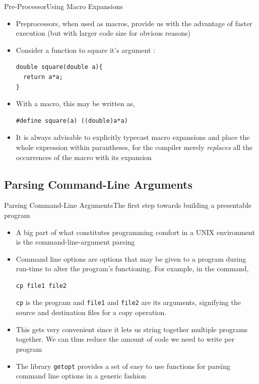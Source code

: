 \documentclass{beamer}
\begin{document}
\begin{frame}[fragile]{Pre-Processor}{Using Macro Expansions}
\begin{itemize}
\item Preprocessors, when used as macros, provide us with the advantage of faster execution (but with larger code size for obvious reasons)
\item Consider a function to square it's argument :
\begin{verbatim}
double square(double a){
  return a*a;
}
\end{verbatim}
\item With a macro, this may be written as,
\begin{verbatim}
#define square(a) ((double)a*a)
\end{verbatim}
\item \alert{It is always advisable to explicitly typecast macro expansions and place the whole expression within parantheses}, for the compiler merely \emph{replaces} all the occurrences of the macro with its expansion
\end{itemize}
\end{frame}

\subsection{Parsing Command-Line Arguments}
\begin{frame}[fragile]{Parsing Command-Line Arguments}{The first step towards building a presentable program}
\begin{itemize}
\item A big part of what constitutes programming comfort in a UNIX environment is the command-line-argument parsing
\item Command line options are options that may be given to a program during run-time to alter the program's functioning. For example, in the command,
\begin{verbatim}
cp file1 file2
\end{verbatim}
\verb|cp| is the program and \verb|file1| and \verb|file2| are its arguments, signifying the source and destination files for a copy operation.
\item This gets very convenient since it lets us string together multiple programs together. We can thus reduce the amount of code we need to write per program
\item The library \verb|getopt| provides a set of easy to use functions for parsing command line options in a generic fashion
\end{itemize}
\end{frame}
\end{document}
